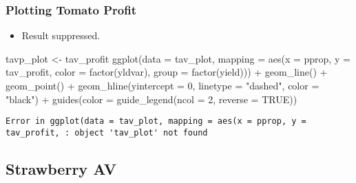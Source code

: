 \documentclass[
  letterpaper,
  DIV=11,
  numbers=noendperiod]{scrartcl}
\newenvironment{Shaded}{\begin{snugshade}}{\end{snugshade}}
\newcommand{\AttributeTok}[1]{\textcolor[rgb]{0.40,0.45,0.13}{#1}}
\newcommand{\ConstantTok}[1]{\textcolor[rgb]{0.56,0.35,0.01}{#1}}
\newcommand{\DecValTok}[1]{\textcolor[rgb]{0.68,0.00,0.00}{#1}}
\newcommand{\FunctionTok}[1]{\textcolor[rgb]{0.28,0.35,0.67}{#1}}
\newcommand{\NormalTok}[1]{\textcolor[rgb]{0.00,0.23,0.31}{#1}}
\newcommand{\OtherTok}[1]{\textcolor[rgb]{0.00,0.23,0.31}{#1}}
\newcommand{\SpecialCharTok}[1]{\textcolor[rgb]{0.37,0.37,0.37}{#1}}
\newcommand{\StringTok}[1]{\textcolor[rgb]{0.13,0.47,0.30}{#1}}
\providecommand{\tightlist}{%
  \setlength{\itemsep}{0pt}\setlength{\parskip}{0pt}}\usepackage{longtable,booktabs,array}
\begin{document}
\subsubsection{Plotting Tomato Profit}\label{plotting-tomato-profit}

\begin{itemize}
\tightlist
\item
  Result suppressed.
\end{itemize}

\begin{Shaded}
\begin{Highlighting}[]
\NormalTok{tavp\_plot }\OtherTok{\textless{}{-}}\NormalTok{ tav\_profit}
\FunctionTok{ggplot}\NormalTok{(}\AttributeTok{data =}\NormalTok{ tav\_plot,}
       \AttributeTok{mapping =} \FunctionTok{aes}\NormalTok{(}\AttributeTok{x =}\NormalTok{ pprop,}
                     \AttributeTok{y =}\NormalTok{ tav\_profit,}
                     \AttributeTok{color =} \FunctionTok{factor}\NormalTok{(yldvar),}
                     \AttributeTok{group =} \FunctionTok{factor}\NormalTok{(yield))) }\SpecialCharTok{+}
  \FunctionTok{geom\_line}\NormalTok{() }\SpecialCharTok{+}
  \FunctionTok{geom\_point}\NormalTok{() }\SpecialCharTok{+}
  \FunctionTok{geom\_hline}\NormalTok{(}\AttributeTok{yintercept =} \DecValTok{0}\NormalTok{,}
             \AttributeTok{linetype =} \StringTok{"dashed"}\NormalTok{,}
             \AttributeTok{color =} \StringTok{"black"}\NormalTok{) }\SpecialCharTok{+}
  \FunctionTok{guides}\NormalTok{(}\AttributeTok{color =} \FunctionTok{guide\_legend}\NormalTok{(}\AttributeTok{ncol =} \DecValTok{2}\NormalTok{,}
                              \AttributeTok{reverse =} \ConstantTok{TRUE}\NormalTok{))}
\end{Highlighting}
\end{Shaded}

\begin{verbatim}
Error in ggplot(data = tav_plot, mapping = aes(x = pprop, y = tav_profit, : object 'tav_plot' not found
\end{verbatim}

\subsection{Strawberry AV}\label{strawberry-av-1}
\end{document}
